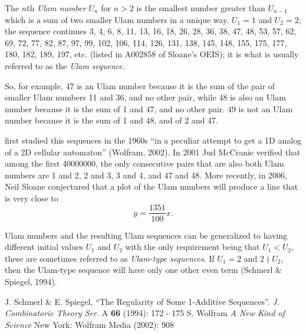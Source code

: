 \documentclass[12pt]{article}
\begin{document}
The $n$th {\em Ulam number} $U_n$ for $n > 2$ is the smallest number greater than $U_{n - 1}$ which is a sum of two smaller Ulam numbers in a unique way. $U_1 = 1$ and $U_2 = 2$; the sequence continues 3, 4, 6, 8, 11, 13, 16, 18, 26, 28, 36, 38, 47, 48, 53, 57, 62, 69, 72, 77, 82, 87, 97, 99, 102, 106, 114, 126, 131, 138, 145, 148, 155, 175, 177, 180, 182, 189, 197, etc. (listed in A002858 of Sloane's OEIS); it is what is usually referred to as the {\em Ulam sequence}.

So, for example, 47 is an Ulam number because it is the sum of the pair of smaller Ulam numbers 11 and 36, and no other pair, while 48 is also an Ulam number because it is the sum of 1 and 47, and no other pair. 49 is not an Ulam number because it is the sum of 1 and 48, and of 2 and 47.

 first studied this sequences in the 1960s ``in a peculiar attempt to get a 1D analog of a 2D cellular automaton'' (Wolfram, 2002). In 2001 Jud McCranie verified that among the first 40000000, the only consecutive pairs that are also both Ulam numbers are 1 and 2, 2 and 3, 3 and 4, and 47 and 48. More recently, in 2006, Neil Sloane conjectured that a plot of the Ulam numbers will produce a line that is very close to $$y = \frac{1351}{100}x.$$

Ulam numbers and the resulting Ulam sequences can be generalized to having different initial values $U_1$ and $U_2$ with the only requirement being that $U_1 < U_2$, these are sometimes referred to as {\em Ulam-type sequences}. If $U_1 = 2$ and $2 \nmid U_2$, then the Ulam-type sequence will have only one other even term (Schmerl \& Spiegel, 1994).

\begin{thebibliography}{2}
 J. Schmerl \& E. Spiegel, ``The Regularity of Some 1-Additive Sequences''. {\it J. Combinatoric Theory Ser.} A {\bf 66} (1994): 172 - 175
 S. Wolfram {\it A New Kind of Science} New York: Wolfram Media (2002): 908
\end{thebibliography}
\end{document}
